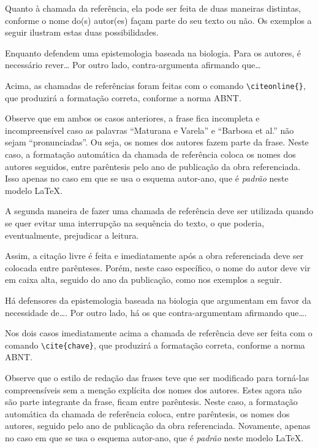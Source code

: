 \begin{apendicesenv}
    Quanto à chamada da referência, ela pode ser feita de duas maneiras distintas, conforme o nome do(s) autor(es) façam parte do seu texto ou não.
    Os exemplos a seguir ilustram estas duas possibilidades.

    Enquanto  defendem uma epistemologia baseada na biologia.
    Para os autores, é necessário rever\ldots
    Por outro lado,  contra-argumenta afirmando que\ldots

    Acima, as chamadas de referências foram feitas com o comando \verb|\citeonline{}|, que produzirá a formatação correta, conforme a norma ABNT.

    Observe que em ambos os casos anteriores, a frase fica incompleta e incompreensível caso as palavras ``Maturana e Varela'' e ``Barbosa et al.'' não sejam ``pronunciadas''.
    Ou seja, os nomes dos autores fazem parte da frase.
    Neste caso, a formatação automática da chamada de referência coloca os nomes dos autores seguidos, entre parêntesis pelo ano de publicação da obra referenciada.
    Isso apenas no caso em que se usa o esquema autor-ano, que é \textit{padrão} neste modelo \LaTeX{}.

    A segunda maneira de fazer uma chamada de referência deve ser utilizada quando se quer evitar uma interrupção na sequência do texto, o que poderia, eventualmente, prejudicar a leitura.

    \newpage

    Assim, a citação livre é feita e imediatamente após a obra referenciada deve ser colocada entre parênteses.
    Porém, neste caso específico, o nome do autor deve vir em caixa alta, seguido do ano da publicação, como nos exemplos a seguir.

    Há defensores da epistemologia baseada na biologia que argumentam em favor da necessidade de\ldots \cite{Maturana2003}.
    Por outro lado, há os que contra-argumentam afirmando que\ldots  \cite{nunes2017local}.

    Nos dois casos imediatamente acima a chamada de referência deve ser feita com o comando \verb|\cite{chave}|, que produzirá a formatação correta, conforme a norma ABNT.

    Observe que o estilo de redação das frases teve que ser modificado para torná-las compreensíveis sem a menção explícita dos nomes dos autores.
    Estes agora não são parte integrante da frase, ficam entre parêntesis.
    Neste caso, a formatação automática da chamada de referência coloca, entre parêntesis, os nomes dos autores, seguido pelo ano de publicação da obra referenciada.
    Novamente, apenas no caso em que se usa o esquema autor-ano, que é \textit{padrão} neste modelo \LaTeX{}.


\end{apendicesenv}
